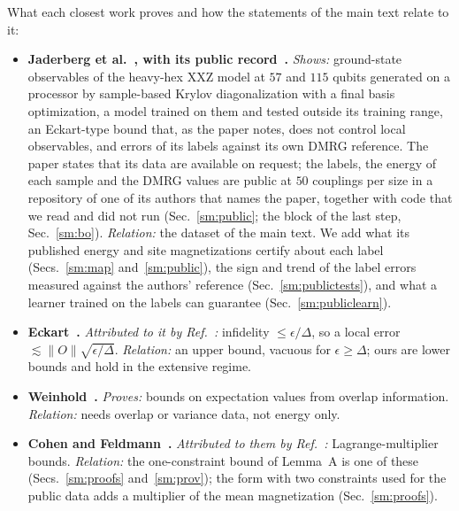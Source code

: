 \documentclass[aps,prx,onecolumn,10pt,nofootinbib,longbibliography,floatfix]{revtex4-2}
\theoremstyle{remark}
\begin{document}
What each closest work proves and how the statements of the main text relate to it:
\begin{itemize}
\item \textbf{Jaderberg et al.~\cite{jaderberg2026}, with its public record~\cite{jaderberg2026data}.} \emph{Shows:} ground-state observables of the heavy-hex XXZ model at $57$ and $115$ qubits generated on a processor by sample-based Krylov diagonalization with a final basis optimization, a model trained on them and tested outside its training range, an Eckart-type bound that, as the paper notes, does not control local observables, and errors of its labels against its own DMRG reference. The paper states that its data are available on request; the labels, the energy of each sample and the DMRG values are public at $50$ couplings per size in a repository of one of its authors that names the paper, together with code that we read and did not run (Sec.~\ref{sm:public}; the block of the last step, Sec.~\ref{sm:bo}). \emph{Relation:} the dataset of the main text. We add what its published energy and site magnetizations certify about each label (Secs.~\ref{sm:map} and~\ref{sm:public}), the sign and trend of the label errors measured against the authors' reference (Sec.~\ref{sm:publictests}), and what a learner trained on the labels can guarantee (Sec.~\ref{sm:publiclearn}). %
\item \textbf{Eckart~\cite{eckart1930}.} \emph{Attributed to it by Ref.~\cite{manchanda2026}:} infidelity $\le\epsilon/\Delta$, so a local error $\lesssim\|O\|\sqrt{\epsilon/\Delta}$. \emph{Relation:} an upper bound, vacuous for $\epsilon\ge\Delta$; ours are lower bounds and hold in the extensive regime. %
\item \textbf{Weinhold~\cite{weinhold1968}.} \emph{Proves:} bounds on expectation values from overlap information. \emph{Relation:} needs overlap or variance data, not energy only. %
\item \textbf{Cohen and Feldmann~\cite{cohen1971}.} \emph{Attributed to them by Ref.~\cite{manchanda2026}:} Lagrange-multiplier bounds. \emph{Relation:} the one-constraint bound of Lemma~A is one of these (Secs.~\ref{sm:proofs} and~\ref{sm:prov}); the form with two constraints used for the public data adds a multiplier of the mean magnetization (Sec.~\ref{sm:proofs}). %

\end{itemize}
\end{document}
